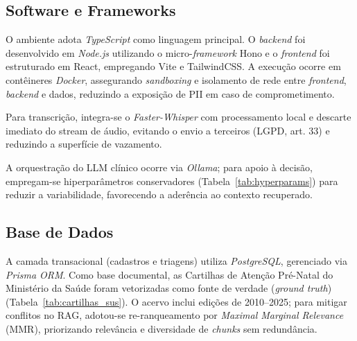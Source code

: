 \documentclass[12pt]{article}
\begin{document}

\subsection{Software e Frameworks}

O ambiente adota \textit{TypeScript} como linguagem principal.
O \textit{backend} foi desenvolvido em \textit{Node.js} utilizando o micro-\textit{framework} Hono e o \textit{frontend} foi estruturado em React, empregando Vite e TailwindCSS.
A execução ocorre em contêineres \textit{Docker}, assegurando \textit{sandboxing} e isolamento de rede entre \textit{frontend}, \textit{backend} e dados, reduzindo a exposição de PII em caso de comprometimento.

Para transcrição, integra-se o \textit{Faster-Whisper} com processamento local e descarte imediato do stream de áudio, evitando o envio a terceiros (LGPD, art. 33) e reduzindo a superfície de vazamento.

A orquestração do LLM clínico ocorre via \textit{Ollama}; para apoio à decisão, empregam-se hiperparâmetros conservadores (Tabela~\ref{tab:hyperparams}) para reduzir a variabilidade, favorecendo a aderência ao contexto recuperado.

\subsection{Base de Dados}

A camada transacional (cadastros e triagens) utiliza \textit{PostgreSQL}, gerenciado via \textit{Prisma ORM}.
Como base documental, as Cartilhas de Atenção Pré-Natal do Ministério da Saúde foram vetorizadas como fonte de verdade (\textit{ground truth}) (Tabela~\ref{tab:cartilhas_sus}).
O acervo inclui edições de 2010--2025; para mitigar conflitos no RAG, adotou-se re-ranqueamento por \textit{Maximal Marginal Relevance} (MMR), priorizando relevância e diversidade de \textit{chunks} sem redundância.
\end{document}
